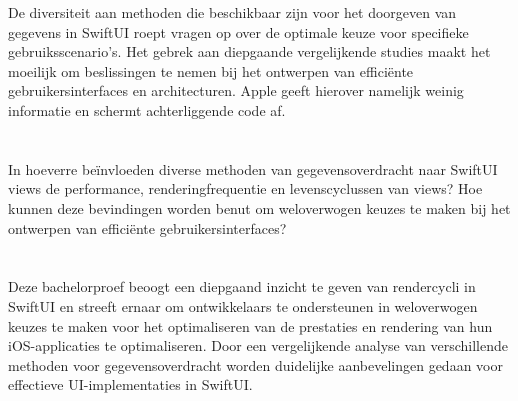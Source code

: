 %
De diversiteit aan methoden die beschikbaar zijn voor het doorgeven van gegevens in SwiftUI roept vragen op over de optimale keuze voor specifieke gebruiksscenario's. Het gebrek aan diepgaande vergelijkende studies maakt het moeilijk om beslissingen te nemen bij het ontwerpen van efficiënte gebruikersinterfaces en architecturen. Apple geeft hierover namelijk weinig informatie en schermt achterliggende code af.


\section{}%
\label{sec:onderzoeksvraag}
In hoeverre beïnvloeden diverse methoden van gegevensoverdracht naar SwiftUI views de performance, renderingfrequentie en levenscyclussen van views? Hoe kunnen deze bevindingen worden benut om weloverwogen keuzes te maken bij het ontwerpen van efficiënte gebruikersinterfaces?

\section{}%
\label{sec:onderzoeksdoelstelling}


Deze bachelorproef beoogt een diepgaand inzicht te geven van rendercycli in SwiftUI en streeft ernaar om ontwikkelaars te ondersteunen in weloverwogen keuzes te maken voor het optimaliseren van de prestaties en rendering van hun iOS-applicaties te optimaliseren. Door een vergelijkende analyse van verschillende methoden voor gegevensoverdracht worden duidelijke aanbevelingen gedaan voor effectieve UI-implementaties in SwiftUI.
